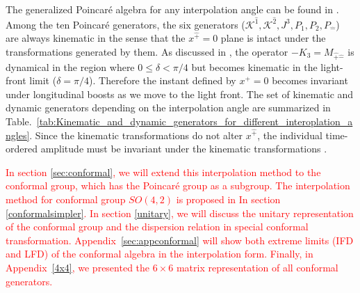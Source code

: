 \documentclass[%
 reprint,
superscriptaddress,
 amsmath,amssymb,
 aps,
]{revtex4-2}
\newcommand{\pT}{\hat{+}}
\newcommand{\mT}{\hat{-}}
\newcommand{\itP}[1]{\hat{#1}}
\begin{document}
The generalized Poincar\'e algebra for any interpolation angle can be found in \cite{Ji2001}. 
Among the ten Poincar\'e generators, the six generators ($\mathcal{K}^{\itP{1}}, \mathcal{K}^{\itP{2}}, J^{3}, P_{1}, P_{2}, P_{\mT}$) are always kinematic in the sense that the $x^{\pT}=0$ plane is intact under the transformations generated by them.
As discussed in \cite{Ji2001, Ji2012}, the operator $-K_3=M_{\pT\mT}$ is dynamical in the region where $0\leq\delta<\pi/4$ but becomes kinematic in the light-front limit ($\delta=\pi/4$). Therefore the instant defined by $x^+=0$ becomes invariant under longitudinal boosts as we move to the light front.
The set of kinematic and dynamic generators depending on the interpolation angle are summarized in Table.~\ref{tab:Kinematic_and_dynamic_generators_for_different_interoplation_angles}.
Since the kinematic transformations do not alter $x^{\pT}$, the individual time-ordered amplitude must be invariant under the kinematic transformations \cite{Ji2018QED}.

\textcolor{red}{In section \ref{sec:conformal}, we will extend this interpolation method to the conformal group, which has the Poincar\'e group as a subgroup. The interpolation method for conformal group $SO(4,2)$ is proposed in In section \ref{conformalsimpler}. In section \ref{unitary}, we will discuss the unitary representation of the conformal group and the dispersion relation in special conformal transformation. Appendix~\ref{sec:appconformal} will show both extreme limits (IFD and LFD) of the conformal algebra in the interpolation form. Finally, in Appendix~\ref{4x4}, we presented the $6\times6$ matrix representation of all conformal generators. }
\end{document}
